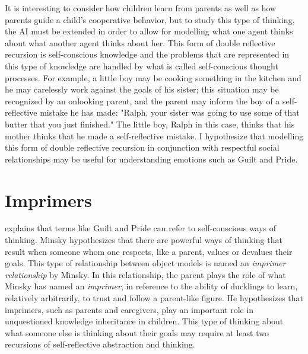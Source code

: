It is interesting to consider how children learn from parents as well
as how parents guide a child's cooperative behavior, but to study this
type of thinking, the AI must be extended in order to allow for
modelling what one agent thinks about what another agent thinks about
her.  This form of double reflective recursion is self-conscious
knowledge and the problems that are represented in this type of
knowledge are handled by what is called self-conscious thought
processes. For example, a little boy may be cooking something in the
kitchen and he may carelessly work against the goals of his sister;
this situation may be recognized by an onlooking parent, and the
parent may inform the boy of a self-reflective mistake he has made:
"Ralph, your sister was going to use some of that butter that you just
finished." The little boy, Ralph in this case, thinks that his mother
thinks that he made a self-reflective mistake. I hypothesize that
modelling this form of double reflective recursion in conjunction with
respectful social relationships may be useful for understanding
emotions such as Guilt and Pride.

\section{Imprimers}

\cite{minsky:2006} explains that terms like Guilt and Pride can refer
to self-conscious ways of thinking.  Minsky hypothesizes that there
are powerful ways of thinking that result when someone whom one
respects, like a parent, values or devalues their goals.  This type of
relationship between object models is named an \emph{imprimer
  relationship} by Minsky.  In this relationship, the parent plays the
role of what Minsky has named an \emph{imprimer}, in reference to the
ability of ducklings to learn, relatively arbitrarily, to trust and
follow a parent-like figure.  He hypothesizes that imprimers, such as
parents and caregivers, play an important role in unquestioned
knowledge inheritance in children.  This type of thinking about what
someone else is thinking about their goals may require at least two
recursions of self-reflective abstraction and thinking.

